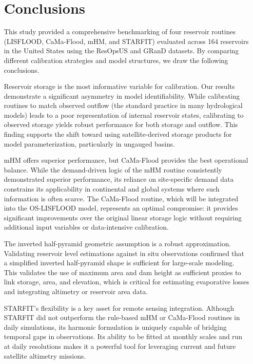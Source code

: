 \documentclass[hess, manuscript]{copernicus}
\begin{document}
\section{Conclusions}
\label{sec:conclusions}

This study provided a comprehensive benchmarking of four reservoir routines (LISFLOOD, CaMa-Flood, mHM, and STARFIT) evaluated across 164 reservoirs in the United States using the ResOpsUS and GRanD datasets. By comparing different calibration strategies and model structures, we draw the following conclusions.

Reservoir storage is the most informative variable for calibration. Our results demonstrate a significant asymmetry in model identifiability. While calibrating routines to match observed outflow (the standard practice in many hydrological models) leads to a poor representation of internal reservoir states, calibrating to observed storage yields robust performance for both storage and outflow. This finding supports the shift toward using satellite-derived storage products for model parameterization, particularly in ungauged basins.

mHM offers superior performance, but CaMa-Flood provides the best operational balance. While the demand-driven logic of the mHM routine consistently demonstrated superior performance, its reliance on site-specific demand data constrains its applicability in continental and global systems where such information is often scarce. The CaMa-Flood routine, which will be integrated into the OS-LISFLOOD model, represents an optimal compromise: it provides significant improvements over the original linear storage logic without requiring additional input variables or data-intensive calibration.

The inverted half-pyramid geometric assumption is a robust approximation. Validating reservoir level estimations against in situ observations confirmed that a simplified inverted half-pyramid shape is sufficient for large-scale modeling. This validates the use of maximum area and dam height as sufficient proxies to link storage, area, and elevation, which is critical for estimating evaporative losses and integrating altimetry or reservoir area data.

STARFIT’s flexibility is a key asset for remote sensing integration. Although STARFIT did not outperform the rule-based mHM or CaMa-Flood routines in daily simulations, its harmonic formulation is uniquely capable of bridging temporal gaps in observations. Its ability to be fitted at monthly scales and run at daily resolutions makes it a powerful tool for leveraging current and future satellite altimetry missions.
\end{document}
